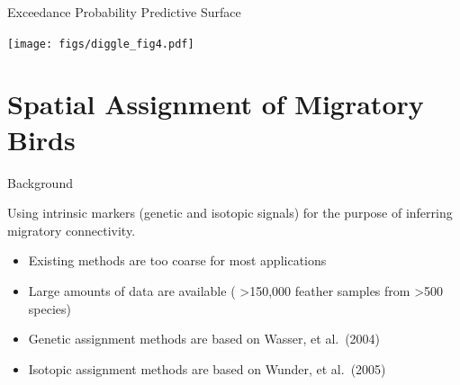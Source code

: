 \documentclass[11pt,ignorenonframetext,]{beamer}
\providecommand{\tightlist}{%
  \setlength{\itemsep}{0pt}\setlength{\parskip}{0pt}}
\begin{document}
\begin{frame}{Exceedance Probability Predictive Surface}
\protect\hypertarget{exceedance-probability-predictive-surface}{}

\begin{center}
\texttt{[image: figs/diggle\_fig4.pdf]}
\end{center}

\end{frame}

\hypertarget{spatial-assignment-of-migratory-birds}{%
\section{Spatial Assignment of Migratory
Birds}\label{spatial-assignment-of-migratory-birds}}

\begin{frame}{Background}
\protect\hypertarget{background}{}

Using intrinsic markers (genetic and isotopic signals) for the purpose
of inferring migratory connectivity.

\vspace{2mm}

\begin{itemize}
\tightlist
\item
  Existing methods are too coarse for most applications
\end{itemize}

\vspace{2mm}

\begin{itemize}
\tightlist
\item
  Large amounts of data are available ( \textgreater 150,000 feather
  samples from \textgreater 500 species)
\end{itemize}

\vspace{2mm}

\begin{itemize}
\tightlist
\item
  Genetic assignment methods are based on Wasser, et al.~(2004)
\end{itemize}

\vspace{2mm}

\begin{itemize}
\tightlist
\item
  Isotopic assignment methods are based on Wunder, et al.~(2005)
\end{itemize}

\end{frame}
\end{document}
